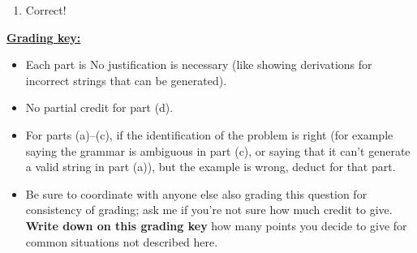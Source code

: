 \documentclass[11pt,fleqn]{article}
\begin{document}
\begin{enumerate}
\begin{multicols}{2}
\begin{enumerate}
                    \columnbreak

              \item Correct!

            \end{enumerate}

            \vspace{-2.5mm}

          \end{multicols}

          \begin{info}{\textbf{\underline{Grading key:}}}

            \begin{itemize}

              \addtolength{\itemsep}{2mm}

              \item Each part is   No justification is
                    necessary (like showing derivations for incorrect
                    strings that can be generated).

              \item No partial credit for part (d).

              \item For parts (a)--(c), if the identification of the problem
                    is right (for example saying the grammar is ambiguous in
                    part (c), or saying that it can't generate a valid
                    string in part (a)), but the example is wrong, deduct
                     for that part.

              \item Be sure to coordinate with anyone else also grading this
                    question for consistency of grading; ask me if you're
                    not sure how much credit to give.  \textbf{Write down on
                    this grading key} how many points you decide to give
                    for common situations not described here.

            \end{itemize}

          \end{info}

          \pagebreak



\end{enumerate}
\end{document}
